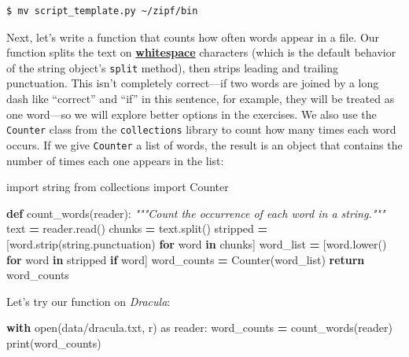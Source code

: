\documentclass[
]{krantz}
\makeatletter
\newenvironment{Shaded}{\begin{snugshade}}{\end{snugshade}}
\newcommand{\BuiltInTok}[1]{#1}
\newcommand{\CommentTok}[1]{\textcolor[rgb]{0.56,0.35,0.01}{\textit{#1}}}
\newcommand{\ControlFlowTok}[1]{\textcolor[rgb]{0.13,0.29,0.53}{\textbf{#1}}}
\newcommand{\ImportTok}[1]{#1}
\newcommand{\KeywordTok}[1]{\textcolor[rgb]{0.13,0.29,0.53}{\textbf{#1}}}
\newcommand{\NormalTok}[1]{#1}
\newcommand{\OperatorTok}[1]{\textcolor[rgb]{0.81,0.36,0.00}{\textbf{#1}}}
\newcommand{\StringTok}[1]{\textcolor[rgb]{0.31,0.60,0.02}{#1}}
\newenvironment{kframe}{%
\medskip{}
\setlength{\fboxsep}{.8em}
 \def\at@end@of@kframe{}%
 \ifinner\ifhmode%
  \def\at@end@of@kframe{\end{minipage}}%
  \begin{minipage}{\columnwidth}%
 \fi\fi%
 \def\FrameCommand##1{\hskip\@totalleftmargin \hskip-\fboxsep
 \colorbox{shadecolor}{##1}\hskip-\fboxsep
     \hskip-\linewidth \hskip-\@totalleftmargin \hskip\columnwidth}%
 \MakeFramed {\advance\hsize-\width
   \@totalleftmargin\z@ \linewidth\hsize
   \@setminipage}}%
 {\par\unskip\endMakeFramed%
 \at@end@of@kframe}
\renewenvironment{Shaded}{\begin{kframe}}{\end{kframe}}
\newcommand{\gref}[2]{\hyperlink{#2}{\textbf{#1}}}
\makeatother
\begin{document}
\begin{verbatim}
$ mv script_template.py ~/zipf/bin
\end{verbatim}

Next,
let's write a function that counts how often words appear in a file.
Our function splits the text on \gref{whitespace}{whitespace} characters
(which is the default behavior of the string object's \texttt{split} method),
then strips leading and trailing punctuation.
This isn't completely correct---if two words are joined by a long dash
like ``correct'' and ``if'' in this sentence, for example,
they will be treated as one word---so
we will explore better options in the exercises.
We also use the \texttt{Counter} class from the \texttt{collections} library
to count how many times each word occurs.
If we give \texttt{Counter} a list of words,
the result is an object that contains
the number of times each one appears in the list:

\begin{Shaded}
\begin{Highlighting}[]
\ImportTok{import}\NormalTok{ string}
\ImportTok{from}\NormalTok{ collections }\ImportTok{import}\NormalTok{ Counter}


\KeywordTok{def}\NormalTok{ count\_words(reader):}
    \CommentTok{"""Count the occurrence of each word in a string."""}
\NormalTok{    text }\OperatorTok{=}\NormalTok{ reader.read()}
\NormalTok{    chunks }\OperatorTok{=}\NormalTok{ text.split()}
\NormalTok{    stripped }\OperatorTok{=}\NormalTok{ [word.strip(string.punctuation) }\ControlFlowTok{for}\NormalTok{ word }\KeywordTok{in}\NormalTok{ chunks]}
\NormalTok{    word\_list }\OperatorTok{=}\NormalTok{ [word.lower() }\ControlFlowTok{for}\NormalTok{ word }\KeywordTok{in}\NormalTok{ stripped }\ControlFlowTok{if}\NormalTok{ word]}
\NormalTok{    word\_counts }\OperatorTok{=}\NormalTok{ Counter(word\_list)}
    \ControlFlowTok{return}\NormalTok{ word\_counts}
\end{Highlighting}
\end{Shaded}

Let's try our function on \emph{Dracula}:

\begin{Shaded}
\begin{Highlighting}[]
\ControlFlowTok{with} \BuiltInTok{open}\NormalTok{(}\StringTok{\textquotesingle{}data/dracula.txt\textquotesingle{}}\NormalTok{, }\StringTok{\textquotesingle{}r\textquotesingle{}}\NormalTok{) }\ImportTok{as}\NormalTok{ reader:}
\NormalTok{    word\_counts }\OperatorTok{=}\NormalTok{ count\_words(reader)}
\BuiltInTok{print}\NormalTok{(word\_counts)}
\end{Highlighting}
\end{Shaded}
\end{document}
